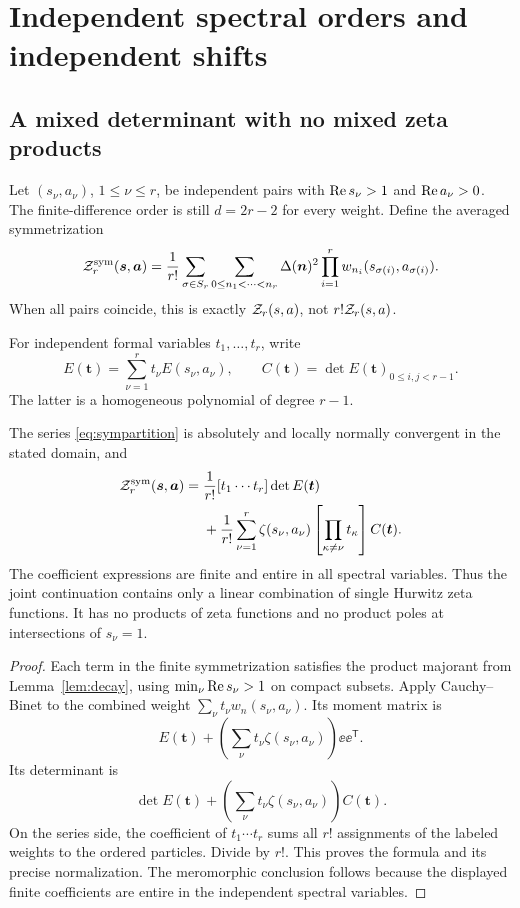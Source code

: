 \section{Independent spectral orders and independent shifts}
\label{sec:polarization}

\subsection{A mixed determinant with no mixed zeta products}
Let $(s_\nu,a_\nu)$, $1\le\nu\le r$, be independent pairs with
$\operatorname{Re} s_\nu>1$ and $\operatorname{Re} a_\nu>0$. The finite-difference order is
still $d=2r-2$ for every weight. Define the averaged symmetrization
\begin{equation}\label{eq:sympartition}
 \mathcal Z_r^{\mathrm{sym}}(\bm s,\bm a)
 =\frac1{r!}\sum_{\sigma\in S_r}
   \sum_{0\le n_1<\cdots<n_r}\Delta(\bm n)^2
      \prod_{i=1}^r w_{n_i}(s_{\sigma(i)},a_{\sigma(i)}).
\end{equation}
When all pairs coincide, this is exactly $\mathcal Z_r(s,a)$, not $r!\mathcal Z_r(s,a)$.

For independent formal variables $t_1,\ldots,t_r$, write
\[
 E(\bm t)=\sum_{\nu=1}^r t_\nu E(s_\nu,a_\nu),\qquad
 C(\bm t)=\det E(\bm t)_{0\le i,j<r-1}.
\]
The latter is a homogeneous polynomial of degree $r-1$.

\begin{theorem}\label{thm:polarized}
The series \eqref{eq:sympartition} is absolutely and locally normally
convergent in the stated domain, and
\begin{align}
 \mathcal Z_r^{\mathrm{sym}}(\bm s,\bm a)
 ={}&\frac1{r!}[t_1\cdots t_r]\det E(\bm t)\notag\\
 &+\frac1{r!}\sum_{\nu=1}^r\zeta(s_\nu,a_\nu)
       \left[\prod_{\kappa\ne\nu}t_\kappa\right]C(\bm t).
       \label{eq:polarized}
\end{align}
The coefficient expressions are finite and entire in all spectral
variables. Thus the joint continuation contains only a linear combination
of single Hurwitz zeta functions. It has no products of zeta functions
and no product poles at intersections of $s_\nu=1$.
\end{theorem}
\begin{proof}
Each term in the finite symmetrization satisfies the product majorant from
Lemma~\ref{lem:decay}, using $\min_\nu\operatorname{Re} s_\nu>1$ on compact subsets.
Apply Cauchy--Binet to the combined weight
$\sum_\nu t_\nu w_n(s_\nu,a_\nu)$. Its moment matrix is
\[
 E(\bm t)+\left(\sum_\nu t_\nu\zeta(s_\nu,a_\nu)\right)
       \ee\ee^{\mathsf T}.
\]
Its determinant is
\[
 \det E(\bm t)+
 \left(\sum_\nu t_\nu\zeta(s_\nu,a_\nu)\right)C(\bm t).
\]
On the series side, the coefficient of $t_1\cdots t_r$ sums all $r!$
assignments of the labeled weights to the ordered particles. Divide by
$r!$. This proves the formula and its precise normalization. The
meromorphic conclusion follows because the displayed finite coefficients
are entire in the independent spectral variables.
\end{proof}

